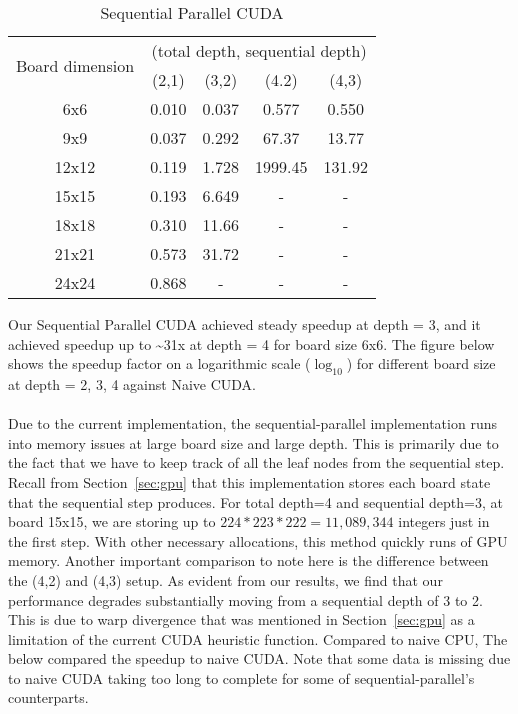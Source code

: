 \begin{table}[!htbp]
\centering
\begin{tabular}{|c|c|c|c|c|} 
\hline
\multirow{2}{*}{Board dimension} & \multicolumn{4}{c|}{(total depth, sequential depth)}     \\ 
\cline{2-5}
                                 & (2,1)       & (3,2)      & (4.2)       & (4,3)        \\ 
\hline
6x6                              & 0.010   & 0.037 & 0.577  & 0.550    \\ 
\hline
9x9                              & 0.037    & 0.292 & 67.37  & 13.77   \\ 
\hline
12x12                            & 0.119   & 1.728 & 1999.45 & 131.92  \\ 
\hline
15x15                            & 0.193   & 6.649 & -      & -        \\ 
\hline
18x18                            & 0.310   & 11.66 & -      & -        \\ 
\hline
21x21                            & 0.573   & 31.72 & -      & -        \\ 
\hline
24x24                            & 0.868   & - & -      & -        \\
\hline
\end{tabular}
\caption{Sequential Parallel CUDA}
\end{table}

\noindent
Our Sequential Parallel CUDA achieved steady speedup at depth = 3, and it achieved speedup up to \textasciitilde{31}x at depth = 4 for board size 6x6. The figure  below shows the speedup factor on a logarithmic scale ($\log_{10}$) for different board size at depth = 2, 3, 4 against Naive CUDA.\\ 
\\
Due to the current implementation, the sequential-parallel implementation runs into memory issues at large board size and large depth. This is primarily due to the fact that we have to keep track of all the leaf nodes from the sequential step. Recall from Section~\ref{sec:gpu} that this implementation stores each board state that the sequential step produces. For total depth=4 and sequential depth=3, at board 15x15, we are storing up to $224*223*222=11,089,344$ integers just in the first step. With other necessary allocations, this method quickly runs of GPU memory. Another important comparison to note here is the difference between the (4,2) and (4,3) setup. As evident from our results, we find that our performance degrades substantially moving from a sequential depth of 3 to 2. This is due to warp divergence that was mentioned in Section~\ref{sec:gpu} as a limitation of the current CUDA heuristic function. Compared to naive CPU, The below compared the speedup to naive CUDA. Note that some data is missing due to naive CUDA taking too long to complete for some of sequential-parallel's counterparts. \\

